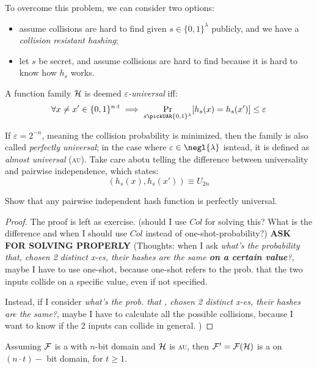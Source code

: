 To overcome this problem, we can consider two options:
\begin{itemize}
    \item assume collisions are hard to find given $s \in \{0,1\}^{\lambda}$ publicly, and we have a \textit{collision resistant hashing};
    \item let $s$ be secret, and assume collisions are hard to find because it is hard to know how $h_{s}$ works.
\end{itemize}

\begin{definition}
    A function family $\mathcal{H}$ is deemed \emph{$\varepsilon$-universal} iff:
    \[
        \forall x \neq x' \in \{0, 1\}^{n\cdot t} \implies \Pr_{s \pickUAR \{0, 1\}^\lambda}[h_s(x) = h_s(x') ] \leq \varepsilon  
    \]
\end{definition}

If $\varepsilon = 2^{-n}$, meaning the collision probability is minimized, then the family is also called \emph{perfectly universal}; in the case where $\varepsilon \in \negl{\lambda}$ isntead, it is defined as \emph{almost universal} (\textsc{au}). Take care abotu telling the difference between universality and pairwise independence, which states:
\[
    (h_s(x), h_s(x')) \equiv U_{2n}
\]

\begin{lemma}
    Show that any pairwise independent hash function is perfectly universal.
\end{lemma}

\begin{proof} The proof is left as exercise.
    (should I use $Col$ for solving this? What is the difference and when I should use $Col$ instead of one-shot-probability?) \textbf{ASK FOR SOLVING PROPERLY} (Thoughts: when I ask \textit{what's the probability that, chosen 2 distinct x-es, their hashes are the same \textbf{on a certain value}?}, maybe I have to use one-shot, because one-shot refers to the prob. that the two inputs collide on a specific value, even if not specified.

    Instead, if I consider \textit{what's the prob. that , chosen 2 distinct x-es, their hashes are the same?}, maybe I have to calculate all the possible collisions, because I want to know if the 2 inputs can collide in general. )
\end{proof}

\begin{theorem}
    Assuming $\mathcal{F}$ is a \prf{} with $n$-bit domain and $\mathcal{H}$ is \textsc{au}, then $\mathcal{F}' = \mathcal{F}(\mathcal{H})$ is a \prf{} on $(n\cdot t)-$ bit domain, for $t \geq 1$.
\end{theorem}

